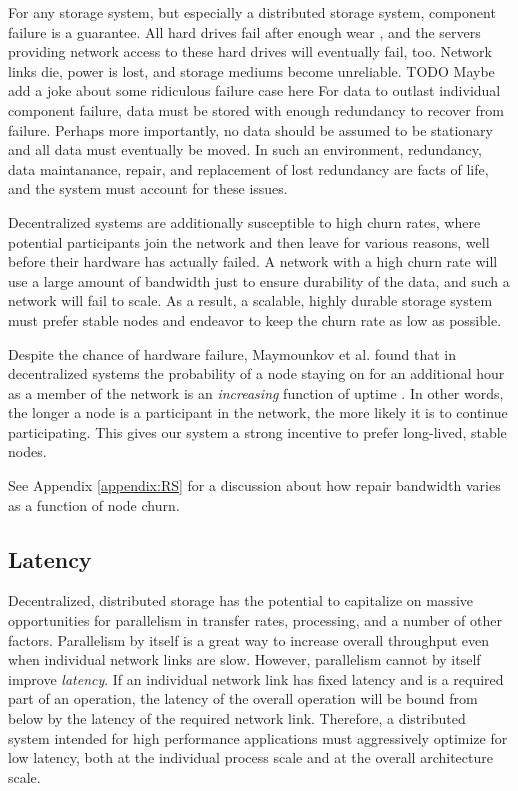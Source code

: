 \documentclass[a4paper,10pt]{article} \usepackage[utf8]{inputenc}
\newcommand{\todo}[1]{{\color{red} TODO #1 }}
\begin{document}
For any storage system, but especially a distributed storage system, component
failure is a guarantee. All hard drives fail after enough wear
\cite{backblaze-hd-2018-q1}, and the servers providing network access to
these hard drives will eventually fail, too. Network links die, power is lost,
and storage mediums become unreliable. \todo{Maybe add a joke about some ridiculous failure case here}  For data to outlast individual component
failure, data must be stored with enough redundancy to recover from failure.
Perhaps more importantly, no data should be assumed to be stationary and all
data must eventually be moved. In such an environment, redundancy, data
maintanance, repair, and replacement of lost redundancy are facts of life, and
the system must account for these issues.

Decentralized systems are additionally susceptible to high churn rates, where
potential participants join the network and then leave for various reasons, well
before their hardware has actually failed. A network with a high churn rate will
use a large amount of bandwidth just to ensure durability of the data, and such
a network will fail to scale. As a result, a scalable, highly durable storage
system must prefer stable nodes and endeavor to keep the churn rate as low as
possible.

Despite the chance of hardware failure, Maymounkov et al. found that in
decentralized systems the probability of a node staying on
for an additional hour as a member of the network is an {\em increasing}
function of uptime \cite{kad}. In other words, the longer a node is a
participant in the network, the more likely it is to continue
participating. This gives our system a strong incentive to prefer long-lived,
stable nodes.

See Appendix \ref{appendix:RS} for a discussion about how repair bandwidth varies as a
function of node churn.

\subsection{Latency}

Decentralized, distributed storage has the potential to capitalize on massive 
opportunities for parallelism in transfer rates, processing, 
and a number of other factors. Parallelism by
itself is a great way to increase overall throughput even when individual
network links are slow. However, parallelism cannot by itself improve {\em
latency}. If an individual network link has fixed latency and is a required part
of an operation, the latency of the overall operation will be bound from below
by the latency of the required network link. Therefore, a distributed system
intended for high performance applications must aggressively optimize for low
latency, both at the individual process scale and at the overall architecture
scale.
\end{document}
